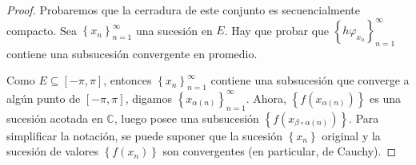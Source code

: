 \documentclass[12pt]{report}
\theoremstyle{largebreak}
\begin{document}
    \begin{proof}
        Probaremos que la cerradura de este conjunto es secuencialmente compacto. Sea $\left\{x_n \right\}_{ n=1}^\infty$ una sucesión en $E$. Hay que probar que $\left\{h\varphi_{ x_n} \right\}_{ n=1}^\infty$ contiene una subsucesión convergente en promedio.

        Como $E\subseteq[-\pi,\pi]$, entonces $\left\{x_n \right\}_{ n=1}^\infty$ contiene una subsucesión que converge a algún punto de $[-\pi,\pi]$, digamos $\left\{x_{\alpha(n)} \right\}_{ n=1}^\infty$. Ahora, $\left\{f(x_{\alpha(n)}) \right\}$ es una sucesión acotada en $\mathbb{C}$, luego posee una subsucesión $\left\{f(x_{ \beta\circ\alpha(n)}) \right\}$. Para simplificar la notación, se puede suponer que la sucesión $\left\{x_n\right\}$ original y la sucesión de valores $\left\{f(x_n) \right\}$ son convergentes (en particular, de Cauchy).


\end{proof}
\end{document}
